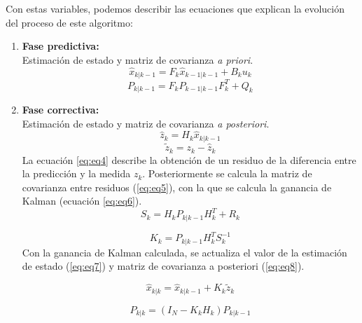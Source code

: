 Con estas variables, podemos describir las ecuaciones que explican la evoluci\'on del proceso de este algoritmo:
\begin{enumerate}
\item \textbf{Fase predictiva:}\\
Estimaci\'on de estado y matriz de covarianza \textit{a priori}.
\begin{equation}
\hat{x}_{k|k-1} = F_k \hat{x}_{k-1|k-1} + B_k u_k
\label{eq:eq1}
\end{equation}
\begin{equation}
P_{k|k-1} = F_{k}P_{k-1|k-1}F_k^{T} + Q_k 
\label{eq:eq2}
\end{equation}
\item \textbf{Fase correctiva:}\\
Estimaci\'on de estado y matriz de covarianza \textit{a posteriori}.
\begin{equation}
\hat{z}_k = H_{k} \hat{x}_{k|k-1}
\label{eq:eq3}
\end{equation}
\begin{equation}
\tilde{z}_k=z_k - \hat{z}_k
\label{eq:eq4}
\end{equation}
La ecuaci\'on \ref{eq:eq4} describe la obtenci\'on de un residuo de la diferencia entre la predicci\'on y la medida $z_k$. Posteriormente se calcula la matriz de covarianza entre residuos (\ref{eq:eq5}), con la que se calcula la ganancia de Kalman (ecuaci\'on \ref{eq:eq6}).
\begin{equation}
S_k = H_k P_{k|k-1} H_{k}^T + R_k
\label{eq:eq5}
\end{equation}

\begin{equation}
K_k = P_{k|k-1} H_k^T S_k^{-1}
\label{eq:eq6}
\end{equation}
Con la ganancia de Kalman calculada, se actualiza el valor de la estimaci\'on de estado (\ref{eq:eq7}) y matriz de covarianza a posteriori (\ref{eq:eq8}). 

\begin{equation}
\hat{x}_{k|k} = \hat{x}_{k|k-1} + K_k \tilde{z}_k
\label{eq:eq7}
\end{equation}

\begin{equation}
P_{k|k} = (I_N - K_kH_k)P_{k|k-1}
\label{eq:eq8}
\end{equation}
\bigskip

\end{enumerate}

